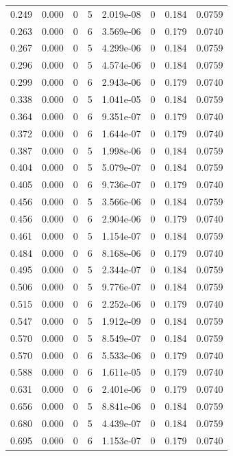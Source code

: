 \documentclass[preview]{standalone}
\begin{document}
{{\begin{tabular}{L{1.2cm}C{1.2cm} C{0.3cm}C{0.5cm} C{1.4cm}C{1.4cm} C{1.4cm}C{1.4cm}}
  0.249  &  0.000  & 0     &  5 &  2.019e-08  & 0  & 0.184 &  0.0759   \\ 
  0.263  &  0.000  & 0     &  6 &  3.569e-06  & 0  & 0.179 &  0.0740   \\ 
  0.267  &  0.000  & 0     &  5 &  4.299e-06  & 0  & 0.184 &  0.0759   \\ 
  0.296  &  0.000  & 0     &  5 &  4.574e-06  & 0  & 0.184 &  0.0759   \\ 
  0.299  &  0.000  & 0     &  6 &  2.943e-06  & 0  & 0.179 &  0.0740   \\ 
  0.338  &  0.000  & 0     &  5 &  1.041e-05  & 0  & 0.184 &  0.0759   \\ 
  0.364  &  0.000  & 0     &  6 &  9.351e-07  & 0  & 0.179 &  0.0740   \\ 
  0.372  &  0.000  & 0     &  6 &  1.644e-07  & 0  & 0.179 &  0.0740   \\ 
  0.387  &  0.000  & 0     &  5 &  1.998e-06  & 0  & 0.184 &  0.0759   \\ 
  0.404  &  0.000  & 0     &  5 &  5.079e-07  & 0  & 0.184 &  0.0759   \\ 
  0.405  &  0.000  & 0     &  6 &  9.736e-07  & 0  & 0.179 &  0.0740   \\ 
  0.456  &  0.000  & 0     &  5 &  3.566e-06  & 0  & 0.184 &  0.0759   \\ 
  0.456  &  0.000  & 0     &  6 &  2.904e-06  & 0  & 0.179 &  0.0740   \\ 
  0.461  &  0.000  & 0     &  5 &  1.154e-07  & 0  & 0.184 &  0.0759   \\ 
  0.484  &  0.000  & 0     &  6 &  8.168e-06  & 0  & 0.179 &  0.0740   \\ 
  0.495  &  0.000  & 0     &  5 &  2.344e-07  & 0  & 0.184 &  0.0759   \\ 
  0.506  &  0.000  & 0     &  5 &  9.776e-07  & 0  & 0.184 &  0.0759   \\ 
  0.515  &  0.000  & 0     &  6 &  2.252e-06  & 0  & 0.179 &  0.0740   \\ 
  0.547  &  0.000  & 0     &  5 &  1.912e-09  & 0  & 0.184 &  0.0759   \\ 
  0.570  &  0.000  & 0     &  5 &  8.549e-07  & 0  & 0.184 &  0.0759   \\ 
  0.570  &  0.000  & 0     &  6 &  5.533e-06  & 0  & 0.179 &  0.0740   \\ 
  0.588  &  0.000  & 0     &  6 &  1.611e-05  & 0  & 0.179 &  0.0740   \\ 
  0.631  &  0.000  & 0     &  6 &  2.401e-06  & 0  & 0.179 &  0.0740   \\ 
  0.656  &  0.000  & 0     &  5 &  8.841e-06  & 0  & 0.184 &  0.0759   \\ 
  0.680  &  0.000  & 0     &  5 &  4.439e-07  & 0  & 0.184 &  0.0759   \\ 
  0.695  &  0.000  & 0     &  6 &  1.153e-07  & 0  & 0.179 &  0.0740   \\ 
\hline 
\end{tabular} 

}}
\end{document}
